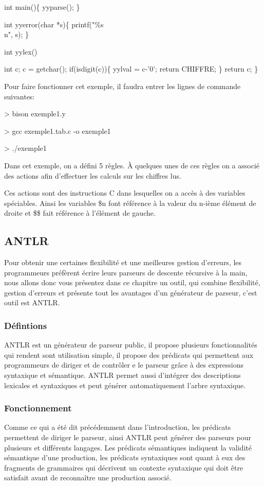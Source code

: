 \documentclass{article}
\begin{document}
int main()\{
    yyparse();   
\}

int yyerror(char *s)\{
    printf("\%s \\n", s);
\}


int yylex()\\{
    int c;
    c = getchar();
    if(isdigit(c))\{
        yylval = c-'0';
        return CHIFFRE;
    \}
    return c;
\}

Pour faire fonctionner cet exemple, il faudra entrer les lignes de commande suivantes:

> bison exemple1.y

> gcc exemple1.tab.c -o exemple1

> ./exemple1

Dans cet exemple, on a défini 5 règles. À quelques unes de ces règles on a associé des actions afin d’effectuer les calculs sur les chiffres lus.

Ces actions sont des instructions C dans lesquelles on a accès à des variables spéciables.
Ainsi les variables \$n font référence à la valeur du n-ième élément de droite et \$\$ fait référence à l’élément de gauche.

\subsection{ANTLR}
Pour obtenir une certaines flexibilité et une meilleures gestion d’erreurs, les programmeurs préfèrent écrire leurs parseurs de descente récursive à la main, nous allons donc vous présentez dans ce chapitre un outil, qui combine flexibilité, gestion d’erreurs  et présente tout les avantages d’un générateur de parseur, c’est outil est ANTLR.
\subsubsection{Défintions}
ANTLR \cite{refANTLR} est un générateur de parseur public, il propose plusieurs fonctionnalités qui rendent sont utilisation simple, il propose  des prédicats qui permettent aux programmeurs de diriger et de contrôler e le parseur grâce à des expressions syntaxique et sémantique.
ANTLR permet aussi d’intégrer des  descriptions lexicales et syntaxiques  et peut générer automatiquement l’arbre syntaxique.
\subsubsection{Fonctionnement}
Comme ce qui a été dit précédemment dans l’introduction, les prédicats permettent de diriger le parseur, ainsi ANTLR peut générer des parseurs pour plusieurs et différents langages.
Les prédicats sémantiques indiquent la validité sémantique d’une production, les prédicats syntaxiques sont quant à eux des fragments de grammaires qui décrivent un contexte syntaxique qui doit être satisfait avant de reconnaître une production associé.
}
\end{document}
